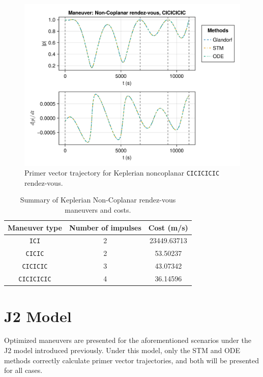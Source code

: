 \begin{figure}[htbp]
    \centering
    \includegraphics[width=\linewidth]{../results/two_body/ipv_noncop/CICICICIC_primer_vector.png}
    \caption{Primer vector trajectory for Keplerian noncoplanar \texttt{CICICICIC} rendez-vous.}
    \label{fig:tb_ncop_CICICICIC_pv}
\end{figure}

\begin{table}[htbp]
    \centering
    \begin{tabular}{ccc} \toprule
        Maneuver type & Number of impulses & Cost (m/s) \\ \midrule
        \texttt{ICI} & 2 & 23449.63713 \\
        \texttt{CICIC} & 2 & 53.50237 \\
        \texttt{CICICIC} & 3 & 43.07342 \\
        \texttt{CICICICIC} & 4 & 36.14596 \\\bottomrule
    \end{tabular}
    \caption{Summary of Keplerian Non-Coplanar rendez-vous maneuvers and costs.}
    \label{tab:Keplerian_nr_summary}
\end{table}

\newpage
\FloatBarrier
\section{J2 Model}

Optimized maneuvers are presented for the aforementioned scenarios under the J2 model introduced previously. Under this model, only the STM and ODE methods correctly calculate primer vector trajectories, and both will be presented for all cases.

